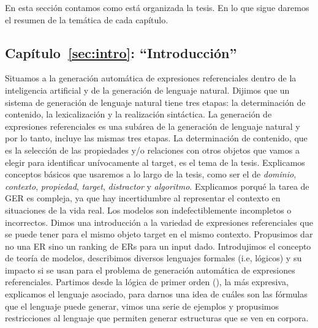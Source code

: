 En esta secci\'on contamos como est\'a organizada la tesis. En lo que sigue daremos el resumen de la tem\'atica de cada cap\'itulo.

\subsection{Cap\'itulo~\ref{sec:intro}: ``Introducci\'on''} 
Situamos a la generaci\'on autom\'atica de expresiones 
referenciales dentro de la inteligencia artificial y de la generaci\'on de lenguaje natural. Dijimos que un sistema de 
generaci\'on de lenguaje natural tiene tres etapas: la determinaci\'on de contenido, la lexicalizaci\'on y la realizaci\'on sint\'actica. La generaci\'on de expresiones referenciales es una sub\'area de la generaci\'on de lenguaje natural y por lo tanto, incluye las mismas tres etapas. La determinaci\'on de contenido, que es la selecci\'on de las propiedades y/o relaciones con otros objetos que vamos a elegir para identificar un\'ivocamente al target, es el tema de la tesis. Explicamos conceptos b\'asicos que usaremos a lo largo de la tesis, como ser el de {\it dominio}, {\it contexto}, {\it propiedad}, {\it target}, {\it distractor} y {\it algoritmo}. Explicamos porqu\'e la tarea de GER es compleja, ya que hay incertidumbre al representar el contexto en situaciones de la vida real. Los modelos son indefectiblemente incompletos o incorrectos. Dimos una introducci\'on a la variedad de expresiones referenciales que 
se puede tener para el mismo objeto target en el mismo contexto. Propusimos dar no una ER sino un ranking de ERs para un input dado.
Introdujimos el concepto de teor\'ia de modelos, describimos diversos lenguajes formales (i.e, l\'ogicos) y su impacto si se usan para el problema de generaci\'on autom\'atica de expresiones referenciales.  Partimos desde la l\'ogica de primer orden (\FOL), la m\'as expresiva, explicamos el lenguaje asociado, para darnos una idea de cu\'ales son las f\'ormulas que el lenguaje puede generar, vimos una serie de ejemplos y propusimos restricciones al lenguaje que permiten generar estructuras que se ven en corpora.

